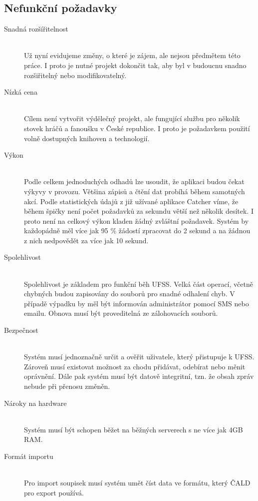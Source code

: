 \documentclass[thesis=B,czech]{FITthesis}[2012/06/26]
\begin{document}
\subsection{Nefunkční požadavky}


\begin{description}

 \item[Snadná rozšířitelnost] \hfill \\
Už nyní evidujeme změny, o které je zájem, ale nejsou předmětem této práce.
I proto je nutné projekt dokončit tak, aby byl v budoucnu snadno rozšiřitelný nebo
modifikovatelný.

 \item[Nízká cena] \hfill \\
Cílem není vytvořit výdělečný projekt, ale fungující službu pro několik stovek hráčů
a fanoušku v České republice. I proto je požadavkem použití volně dostupných
knihoven a technologií.

 \item[Výkon] \hfill \\
Podle celkem jednoduchých odhadů lze usoudit, že aplikaci budou čekat výkyvy v provozu.
Většina zápisů a čtění dat probíhá během samotných akcí. Podle statistických údajů
z již užívané aplikace Catcher víme, že během špičky není počet požadavků za sekundu
větší než několik desítek. I proto není na celkový výkon kladen žádný zvláštní požadavek.
Systém by každopádně měl více jak 95 \% žádostí zpracovat do 2 sekund a na žádnou z nich
nedpovědět za více jak 10 sekund.

 \item[Spolehlivost] \hfill \\
Spolehlivost je základem pro funkční běh UFSS. Velká část operací, včetně chybných budou
zapisovány do souborů pro snadné odhalení chyb. V případě výpadku by měl být informován
administrátor pomocí SMS nebo emailu. Obnova musí být proveditelná ze zálohovacích souborů.

 \item[Bezpečnost] \hfill \\
Systém musí jednoznačně určit a ověřit uživatele, který přistupuje k UFSS. Zároveň musí
existovat možnost za chodu přidávat, odebírat nebo měnit oprávnění. Dále pak systém musí
být datově integritní, tzn. že obsah zpráv nebude při přenosu změněn.

 \item[Nároky na hardware] \hfill \\
Systém musí být schopen běžet na běžných serverech s ne více jak 4GB RAM.

 \item[Formát importu] \hfill \\
Pro import soupisek musí systém umět číst data ve formátu, který ČALD pro export používá.

\end{description}
\end{document}
